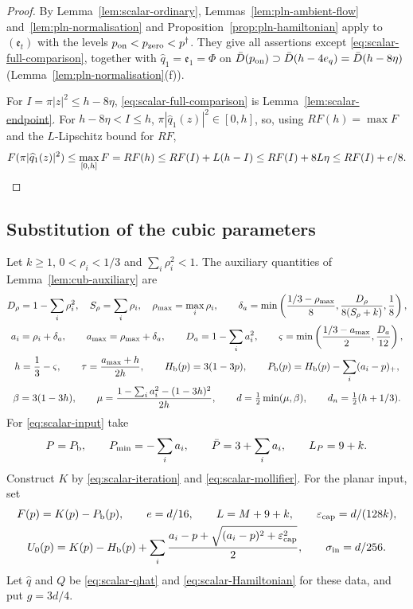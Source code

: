 \begin{proof}
By Lemma~\ref{lem:scalar-ordinary}, Lemmas~\ref{lem:pln-ambient-flow} and~\ref{lem:pln-normalisation} and
Proposition~\ref{prop:pln-hamiltonian} apply to $(\mathfrak e_t)$ with the levels $p_{\rm on}<p_{\rm zero}<p^\dagger$. They give
all assertions except \eqref{eq:scalar-full-comparison}, together with $\widehat q_1=\mathfrak e_1=\Phi$ on
$\bar D(p_{\rm on})\supset\bar D(h-4e_q)=\bar D(h-8\eta)$ (Lemma~\ref{lem:pln-normalisation}(f)).

For $I=\pi|z|^2\le h-8\eta$, \eqref{eq:scalar-full-comparison} is Lemma~\ref{lem:scalar-endpoint}. For $h-8\eta<I\le h$,
$\pi|\widehat q_1(z)|^2\in[0,h]$, so, using $RF(h)=\max F$ and the $L$-Lipschitz bound for $RF$,
\[
 F(\pi|\widehat q_1(z)|^2)\le\max_{[0,h]}F=RF(h)\le RF(I)+L(h-I)\le RF(I)+8L\eta\le RF(I)+e/8 .\qedhere
\]
\end{proof}

\subsection{Substitution of the cubic parameters}\label{sec:scalar-cubic}

Let $k\ge1$, $0<\rho_i<1/3$ and $\sum_i\rho_i^2<1$. The auxiliary quantities of
Lemma~\ref{lem:cub-auxiliary} are
\begin{gather}\label{eq:scalar-cubic-parameters}
 D_\rho=1-\sum_i\rho_i^2,\quad S_\rho=\sum_i\rho_i,\quad \rho_{\max}=\max_i\rho_i,\qquad
 \delta_a=\min\left(\frac{1/3-\rho_{\max}}8,\frac{D_\rho}{8(S_\rho+k)},\frac18\right),\\
 a_i=\rho_i+\delta_a,\qquad a_{\max}=\rho_{\max}+\delta_a,\qquad D_a=1-\sum_ia_i^2,\qquad
 \varsigma=\min\left(\frac{1/3-a_{\max}}2,\frac{D_a}{12}\right),\notag\\
 h=\frac13-\varsigma,\qquad \tau=\frac{a_{\max}+h}{2h},\qquad
 H_{\mathrm b}(p)=3(1-3p),\qquad P_{\mathrm b}(p)=H_{\mathrm b}(p)-\sum_i(a_i-p)_+,\notag\\
 \beta=3(1-3h),\qquad \mu=\frac{1-\sum_ia_i^2-(1-3h)^2}{2h},\qquad
 d=\tfrac12\min(\mu,\beta),\qquad d_n=\tfrac12(h+1/3).\notag
\end{gather}
For \eqref{eq:scalar-input} take
\begin{equation}\label{eq:scalar-cubic-input}
 P=P_{\mathrm b},\qquad P_{\min}=-\sum_i a_i,\qquad \bar P=3+\sum_i a_i,\qquad L_P=9+k.
\end{equation}
Construct $K$ by \eqref{eq:scalar-iteration} and \eqref{eq:scalar-mollifier}. For the planar input, set
\begin{gather}\label{eq:scalar-cubic-planar}
 F(p)=K(p)-P_{\mathrm b}(p),\qquad e=d/16,\qquad L=M+9+k,\qquad \varepsilon_{\rm cap}=d/(128k),\\
 U_0(p)=K(p)-H_{\mathrm b}(p)+\sum_i\frac{a_i-p+\sqrt{(a_i-p)^2+\varepsilon_{\rm cap}^2}}2,
 \qquad \sigma_{\rm in}=d/256.\notag
\end{gather}
Let $\widehat q$ and $Q$ be \eqref{eq:scalar-qhat} and \eqref{eq:scalar-Hamiltonian} for these data, and put
$g=3d/4$.

